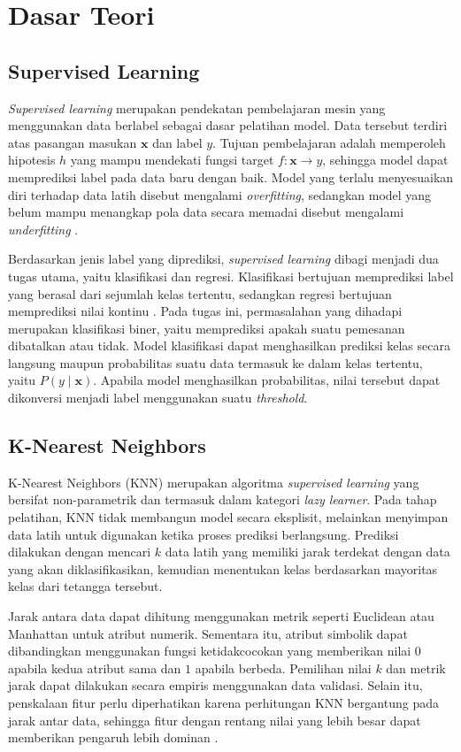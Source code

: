 \section{Dasar Teori}

\subsection{Supervised Learning}
\textit{Supervised learning} merupakan pendekatan pembelajaran mesin yang menggunakan data berlabel sebagai dasar pelatihan model. Data tersebut terdiri atas pasangan masukan $\mathbf{x}$ dan label $y$. Tujuan pembelajaran adalah memperoleh hipotesis $h$ yang mampu mendekati fungsi target $f:\mathbf{x}\rightarrow y$, sehingga model dapat memprediksi label pada data baru dengan baik. Model yang terlalu menyesuaikan diri terhadap data latih disebut mengalami \textit{overfitting}, sedangkan model yang belum mampu menangkap pola data secara memadai disebut mengalami \textit{underfitting} \cite{ref:materi-07}.

Berdasarkan jenis label yang diprediksi, \textit{supervised learning} dibagi menjadi dua tugas utama, yaitu klasifikasi dan regresi. Klasifikasi bertujuan memprediksi label yang berasal dari sejumlah kelas tertentu, sedangkan regresi bertujuan memprediksi nilai kontinu \cite{ref:materi-07}. Pada tugas ini, permasalahan yang dihadapi merupakan klasifikasi biner, yaitu memprediksi apakah suatu pemesanan dibatalkan atau tidak. Model klasifikasi dapat menghasilkan prediksi kelas secara langsung maupun probabilitas suatu data termasuk ke dalam kelas tertentu, yaitu $P(y\mid\mathbf{x})$. Apabila model menghasilkan probabilitas, nilai tersebut dapat dikonversi menjadi label menggunakan suatu \textit{threshold}.

\subsection{K-Nearest Neighbors}
K-Nearest Neighbors (KNN) merupakan algoritma \textit{supervised learning} yang bersifat non-parametrik dan termasuk dalam kategori \textit{lazy learner}. Pada tahap pelatihan, KNN tidak membangun model secara eksplisit, melainkan menyimpan data latih untuk digunakan ketika proses prediksi berlangsung. Prediksi dilakukan dengan mencari $k$ data latih yang memiliki jarak terdekat dengan data yang akan diklasifikasikan, kemudian menentukan kelas berdasarkan mayoritas kelas dari tetangga tersebut.

Jarak antara data dapat dihitung menggunakan metrik seperti Euclidean atau Manhattan untuk atribut numerik. Sementara itu, atribut simbolik dapat dibandingkan menggunakan fungsi ketidakcocokan yang memberikan nilai $0$ apabila kedua atribut sama dan $1$ apabila berbeda. Pemilihan nilai $k$ dan metrik jarak dapat dilakukan secara empiris menggunakan data validasi. Selain itu, penskalaan fitur perlu diperhatikan karena perhitungan KNN bergantung pada jarak antar data, sehingga fitur dengan rentang nilai yang lebih besar dapat memberikan pengaruh lebih dominan \cite{ref:materi-10b}.


